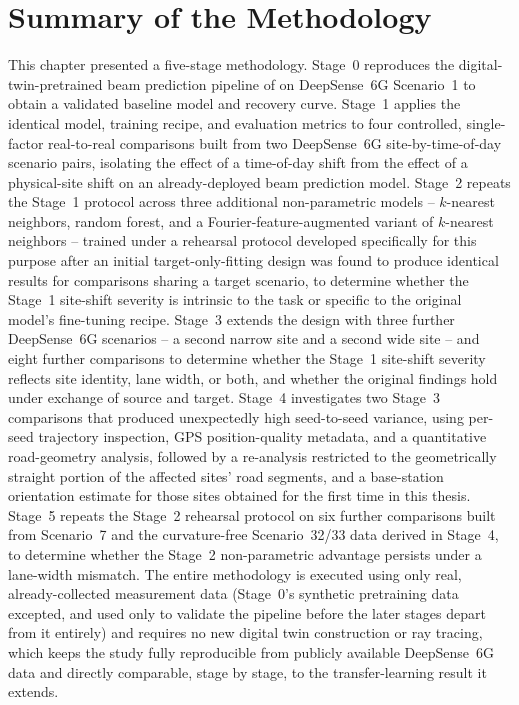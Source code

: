\documentclass{iutbscthesis}
\begin{document}
\section{Summary of the Methodology}
\label{sec:methodsummary}

This chapter presented a five-stage methodology. Stage~0 reproduces the digital-twin-pretrained beam prediction pipeline of \textcite{jiang2023digitaltwinbeam} on DeepSense~6G Scenario~1 to obtain a validated baseline model and recovery curve. Stage~1 applies the identical model, training recipe, and evaluation metrics to four controlled, single-factor real-to-real comparisons built from two DeepSense~6G site-by-time-of-day scenario pairs, isolating the effect of a time-of-day shift from the effect of a physical-site shift on an already-deployed beam prediction model. Stage~2 repeats the Stage~1 protocol across three additional non-parametric models -- $k$-nearest neighbors, random forest, and a Fourier-feature-augmented variant of $k$-nearest neighbors -- trained under a rehearsal protocol developed specifically for this purpose after an initial target-only-fitting design was found to produce identical results for comparisons sharing a target scenario, to determine whether the Stage~1 site-shift severity is intrinsic to the task or specific to the original model's fine-tuning recipe. Stage~3 extends the design with three further DeepSense~6G scenarios -- a second narrow site and a second wide site -- and eight further comparisons to determine whether the Stage~1 site-shift severity reflects site identity, lane width, or both, and whether the original findings hold under exchange of source and target. Stage~4 investigates two Stage~3 comparisons that produced unexpectedly high seed-to-seed variance, using per-seed trajectory inspection, GPS position-quality metadata, and a quantitative road-geometry analysis, followed by a re-analysis restricted to the geometrically straight portion of the affected sites' road segments, and a base-station orientation estimate for those sites obtained for the first time in this thesis. Stage~5 repeats the Stage~2 rehearsal protocol on six further comparisons built from Scenario~7 and the curvature-free Scenario~32/33 data derived in Stage~4, to determine whether the Stage~2 non-parametric advantage persists under a lane-width mismatch. The entire methodology is executed using only real, already-collected measurement data (Stage~0's synthetic pretraining data excepted, and used only to validate the pipeline before the later stages depart from it entirely) and requires no new digital twin construction or ray tracing, which keeps the study fully reproducible from publicly available DeepSense~6G data and directly comparable, stage by stage, to the transfer-learning result it extends.
\end{document}
